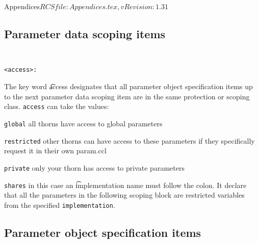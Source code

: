 \begin{cactuspart}{6}{Appendices}{$RCSfile: Appendices.tex,v $}{$Revision: 1.31 $}
\subsection{Parameter data scoping items}
{\tt
\begin{verbatim}
<access>:
\end{verbatim}
}
The key word {\t access} designates that all parameter object specification
items up to the next parameter data scoping item are in the same
protection or scoping class. {\tt access} can take the values:
\begin{Lentry}
\item[{\tt global}] all thorns have access to global parameters
\item[{\tt restricted}] other thorns can have access to these
                           parameters if they specifically request
                           it in their own param.ccl
\item[{\tt private}] only your thorn has access to private parameters
\item[{\tt shares}] in this case an {\t implementation} name must follow
                        the colon. It declare that all the parameters in
                        the following scoping block are restricted variables
                        from the specified {\tt implementation}.
\end{Lentry}


\subsection{Parameter object specification items}
\label{sec:paobspit}


\end{cactuspart}
